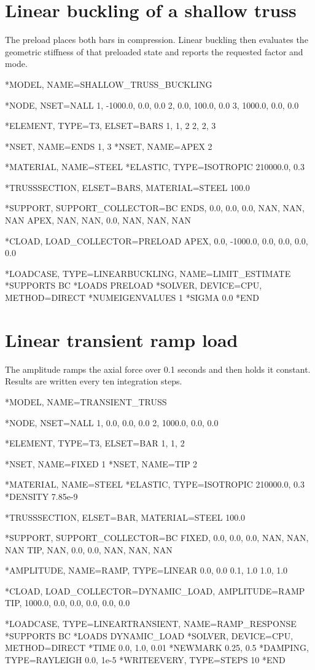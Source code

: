 \section{Linear buckling of a shallow truss}

The preload places both bars in compression. Linear buckling then evaluates the geometric stiffness of that preloaded state and reports the requested factor and mode.

\begin{exampledeck}
*MODEL, NAME=SHALLOW_TRUSS_BUCKLING

*NODE, NSET=NALL
1, -1000.0,   0.0, 0.0
2,     0.0, 100.0, 0.0
3,  1000.0,   0.0, 0.0

*ELEMENT, TYPE=T3, ELSET=BARS
1, 1, 2
2, 2, 3

*NSET, NAME=ENDS
1, 3
*NSET, NAME=APEX
2

*MATERIAL, NAME=STEEL
*ELASTIC, TYPE=ISOTROPIC
210000.0, 0.3

*TRUSSSECTION, ELSET=BARS, MATERIAL=STEEL
100.0

*SUPPORT, SUPPORT_COLLECTOR=BC
ENDS, 0.0, 0.0, 0.0, NAN, NAN, NAN
APEX, NAN, NAN, 0.0, NAN, NAN, NAN

*CLOAD, LOAD_COLLECTOR=PRELOAD
APEX, 0.0, -1000.0, 0.0, 0.0, 0.0, 0.0

*LOADCASE, TYPE=LINEARBUCKLING, NAME=LIMIT_ESTIMATE
*SUPPORTS
BC
*LOADS
PRELOAD
*SOLVER, DEVICE=CPU, METHOD=DIRECT
*NUMEIGENVALUES
1
*SIGMA
0.0
*END
\end{exampledeck}

\section{Linear transient ramp load}

The amplitude ramps the axial force over 0.1 seconds and then holds it constant. Results are written every ten integration steps.

\begin{exampledeck}
*MODEL, NAME=TRANSIENT_TRUSS

*NODE, NSET=NALL
1,    0.0, 0.0, 0.0
2, 1000.0, 0.0, 0.0

*ELEMENT, TYPE=T3, ELSET=BAR
1, 1, 2

*NSET, NAME=FIXED
1
*NSET, NAME=TIP
2

*MATERIAL, NAME=STEEL
*ELASTIC, TYPE=ISOTROPIC
210000.0, 0.3
*DENSITY
7.85e-9

*TRUSSSECTION, ELSET=BAR, MATERIAL=STEEL
100.0

*SUPPORT, SUPPORT_COLLECTOR=BC
FIXED, 0.0, 0.0, 0.0, NAN, NAN, NAN
TIP,   NAN, 0.0, 0.0, NAN, NAN, NAN

*AMPLITUDE, NAME=RAMP, TYPE=LINEAR
0.0, 0.0
0.1, 1.0
1.0, 1.0

*CLOAD, LOAD_COLLECTOR=DYNAMIC_LOAD, AMPLITUDE=RAMP
TIP, 1000.0, 0.0, 0.0, 0.0, 0.0, 0.0

*LOADCASE, TYPE=LINEARTRANSIENT, NAME=RAMP_RESPONSE
*SUPPORTS
BC
*LOADS
DYNAMIC_LOAD
*SOLVER, DEVICE=CPU, METHOD=DIRECT
*TIME
0.0, 1.0, 0.01
*NEWMARK
0.25, 0.5
*DAMPING, TYPE=RAYLEIGH
0.0, 1e-5
*WRITEEVERY, TYPE=STEPS
10
*END
\end{exampledeck}
